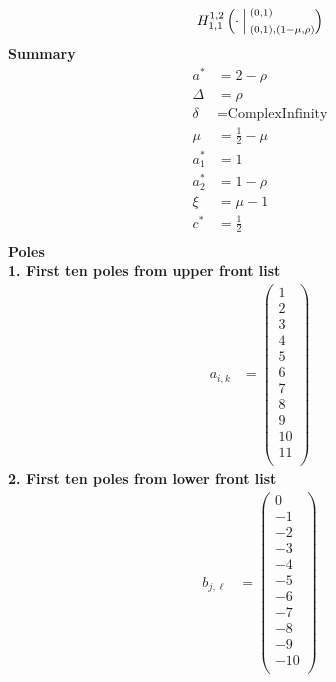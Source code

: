 \documentclass{article}
\newcommand{\FoxH}[5]{H_{#2}^{#1}\left(#3\:\middle\vert\: \begin{subarray}{l}#4\\[0.4em] #5\end{subarray}\right)}
\begin{document}
\begin{align*}
\FoxH{1,2}{1,1}{\cdot}{\left(0, 1\right)}{\left(0, 1\right), \left(1-\mu, \rho\right)}
\end{align*}
\noindent\textbf{Summary}
\begin{align*}
a^* &= 2-\rho \\
\Delta &= \rho \\
\delta &= \text{ComplexInfinity} \\
\mu &= \frac{1}{2}-\mu \\
a_1^* &= 1 \\
a_2^* &= 1-\rho \\
\xi &= \mu -1 \\
c^* &= \frac{1}{2} \\
\end{align*}
\noindent\textbf{Poles}\\
\noindent\textbf{1. First ten poles from upper front list}
\begin{align*}
a_{i,k} &= \left(
\begin{array}{c}
 1 \\
 2 \\
 3 \\
 4 \\
 5 \\
 6 \\
 7 \\
 8 \\
 9 \\
 10 \\
 11 \\
\end{array}
\right)
\end{align*}
\noindent\textbf{2. First ten poles from lower front list}
\begin{align*}
b_{j,\ell} &= \left(
\begin{array}{c}
 0 \\
 -1 \\
 -2 \\
 -3 \\
 -4 \\
 -5 \\
 -6 \\
 -7 \\
 -8 \\
 -9 \\
 -10 \\
\end{array}
\right)
\end{align*}
\end{document}
